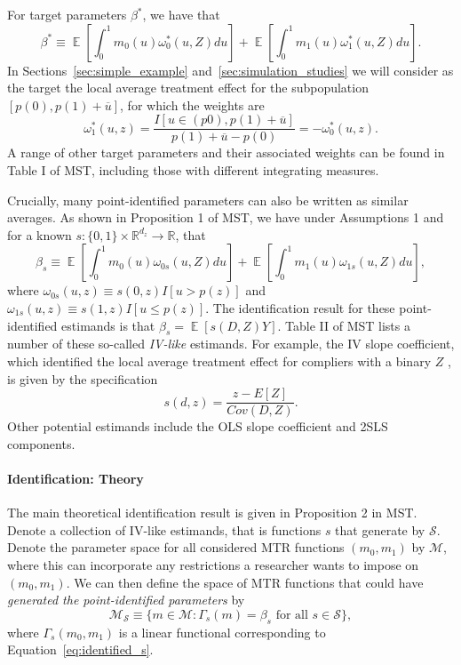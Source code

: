\documentclass[12pt,a4paper,english]{article} %
\DeclareMathOperator*{\E}{\mathbb{E}}
\numberwithin{equation}{section}
\theoremstyle{definition}
\theoremstyle{remark}
\theoremstyle{plain}
\begin{document}
For target parameters $\beta^*$, we have that
\begin{equation}\label{eq:target}
  \beta^* \equiv \E\left[\int_0^1m_0(u)\omega^*_0(u,Z)du\right] + \E\left[\int_0^1m_1(u)\omega^*_1(u,Z)du\right].
\end{equation}
In Sections~\ref{sec:simple_example} and~\ref{sec:simulation_studies} we will consider as the target the local average treatment effect for the subpopulation $[p(0), p(1) + \overline{u}]$, for which the weights are
\begin{equation*}
  \omega^*_1(u, z) = \frac{I[u\in(p0), p(1) + \overline{u}]}{p(1) + \overline{u} - p(0)} = -\omega^*_0(u,z).
\end{equation*}
A range of other target parameters and their associated weights can be found in Table I of MST, including those with different integrating measures.

Crucially, many point-identified parameters can also be written as similar averages.
As shown in Proposition 1 of MST, we have under Assumptions 1 and for a known $s: \{0,1\}\times \mathbb{R}^{d_z} \to \mathbb{R}$, that
\begin{equation}\label{eq:identified_s}
  \beta_s \equiv \E\left[\int_0^1m_0(u)\omega_{0s}(u,Z)du\right] + \E\left[\int_0^1m_1(u)\omega_{1s}(u,Z)du\right],
\end{equation}
where $\omega_{0s}(u,z) \equiv s(0, z)I[u > p(z)]$ and $\omega_{1s}(u,z) \equiv s(1,z) I[u\leq p(z)]$.
The identification result for these point-identified estimands is that $\beta_s = \E[s(D,Z)Y]$.
Table II of MST lists a number of these so-called \textit{IV-like} estimands.
For example, the IV slope coefficient, which identified the local average treatment effect for compliers with a binary $Z$ \citep{imbens_angrist1994ecma}, is given by the specification
\begin{equation*}
  s(d,z) = \frac{z - E[Z]}{Cov(D,Z)}.
\end{equation*}
Other potential estimands include the OLS slope coefficient and 2SLS components.

\paragraph{Identification: Theory}
The main theoretical identification result is given in Proposition 2 in MST.\@
Denote a collection of IV-like estimands, that is functions $s$ that generate by $\mathcal{S}$.
Denote the parameter space for all considered MTR functions $(m_0, m_1)$ by $\mathcal{M}$, where this can incorporate any restrictions a researcher wants to impose on $(m_0, m_1)$.
We can then define the space of MTR functions that could have \textit{generated the point-identified parameters} by
\begin{equation*}
  \mathcal{M}_{\mathcal{S}} \equiv \{m\in \mathcal{M}: \Gamma_s(m) = \beta_s \text{ for all } s\in\mathcal{S}\},
\end{equation*}
where $\Gamma_s(m_0, m_1)$ is a linear functional corresponding to Equation~\ref{eq:identified_s}.
\end{document}
